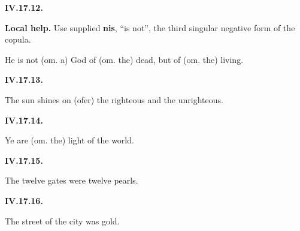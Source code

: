 \par\begin{minipage}{\linewidth}\raggedright
\textbf{IV.17.12.}

\textbf{Local help.} Use supplied \textbf{nis}, “is not”, the third singular negative form of the copula.

He is not (om. a) God of (om. the) dead, but of (om. the) living.

\end{minipage}\par\addvspace{4pt}

\par\begin{minipage}{\linewidth}\raggedright
\textbf{IV.17.13.}

The sun shines on (ofer) the righteous and the unrighteous.

\end{minipage}\par\addvspace{4pt}

\par\begin{minipage}{\linewidth}\raggedright
\textbf{IV.17.14.}

Ye are (om. the) light of the world.

\end{minipage}\par\addvspace{4pt}

\par\begin{minipage}{\linewidth}\raggedright
\textbf{IV.17.15.}

The twelve gates were twelve pearls.

\end{minipage}\par\addvspace{4pt}

\par\begin{minipage}{\linewidth}\raggedright
\textbf{IV.17.16.}

The street of the city was gold.

\end{minipage}\par\addvspace{4pt}

